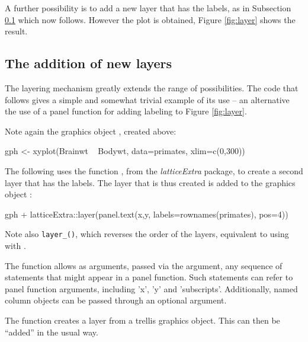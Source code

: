 A further possibility is to add a new layer that has the labels, as
in Subsection \ref{ss:layer} which now follows.
However the plot is obtained, Figure \ref{fig:layer} shows the result.

\subsection{The addition of new layers}\label{ss:layer}
The layering mechanism greatly extends the range of possibilities.
The code that follows gives a simple and somewhat trivial example
of its use -- an alternative the use of a panel function for adding
labeling to Figure \ref{fig:layer}.

Note again the graphics object , created above:
\begin{Schunk}
\begin{Sinput}
gph <- xyplot(Brainwt ~ Bodywt,  data=primates,
              xlim=c(0,300))
\end{Sinput}
\end{Schunk}
\noindent
The following uses the function , from the
\textit{latticeExtra} package, to create a second layer that has the
labels. The layer that is thus created is added to the graphics object
:
\begin{Schunk}
\begin{Sinput}
gph + latticeExtra::layer(panel.text(x,y,
                       labels=rownames(primates),
                       pos=4))
\end{Sinput}
\end{Schunk}
\noindent Note also
\texttt{layer\_()}, which reverses the order of the layers,
equivalent to using  with .

The function  allows as arguments,
passed via the \txtt{\ldots} argument, any sequence of statements
that might appear in a panel function.  Such statements can refer to
panel function arguments, including 'x', 'y' and 'subscripts'.
Additionally, named column objects can be passed through an optional
 argument.

The function  creates a layer from a trellis graphics
object.  This can then be ``added'' in the usual way.

